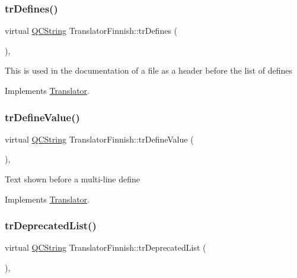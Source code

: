 \subsubsection{\texorpdfstring{trDefines()}{trDefines()}}
{\footnotesize\ttfamily virtual \mbox{\hyperlink{class_q_c_string}{Q\+C\+String}} Translator\+Finnish\+::tr\+Defines (\begin{DoxyParamCaption}{ }\end{DoxyParamCaption})\hspace{0.3cm}{\ttfamily [inline]}, {\ttfamily [virtual]}}

This is used in the documentation of a file as a header before the list of defines 

Implements \mbox{\hyperlink{class_translator}{Translator}}.

\mbox{\label{class_translator_finnish_a1edbf21015c059d72a53a1337fe619da}} 
\subsubsection{\texorpdfstring{trDefineValue()}{trDefineValue()}}
{\footnotesize\ttfamily virtual \mbox{\hyperlink{class_q_c_string}{Q\+C\+String}} Translator\+Finnish\+::tr\+Define\+Value (\begin{DoxyParamCaption}{ }\end{DoxyParamCaption})\hspace{0.3cm}{\ttfamily [inline]}, {\ttfamily [virtual]}}

Text shown before a multi-\/line define 

Implements \mbox{\hyperlink{class_translator}{Translator}}.

\mbox{\label{class_translator_finnish_a2e4f5ed8e42ed99a3143107104cdb3b9}} 
\subsubsection{\texorpdfstring{trDeprecatedList()}{trDeprecatedList()}}
{\footnotesize\ttfamily virtual \mbox{\hyperlink{class_q_c_string}{Q\+C\+String}} Translator\+Finnish\+::tr\+Deprecated\+List (\begin{DoxyParamCaption}{ }\end{DoxyParamCaption})\hspace{0.3cm}{\ttfamily [inline]}, {\ttfamily [virtual]}}

